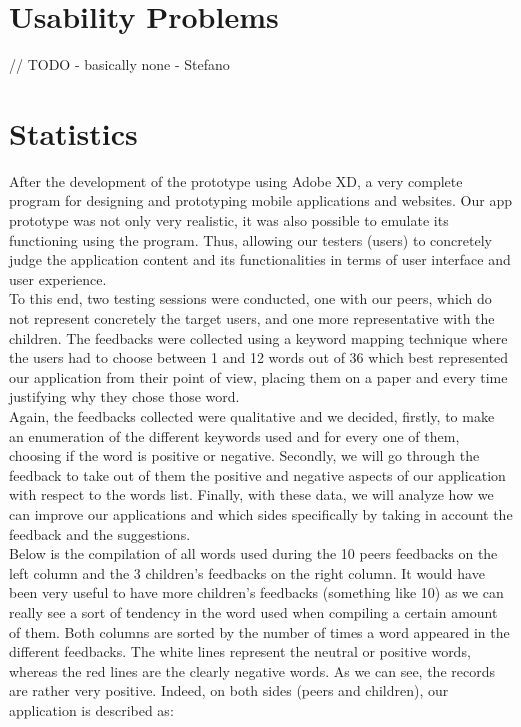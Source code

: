 \documentclass[12pt]{scrartcl}
\begin{document}
\section{Usability Problems}

	
	// TODO - basically none - Stefano
	
	
\section{Statistics}


	After the development of the prototype using Adobe XD, a very complete program for designing and prototyping mobile applications and websites. Our app prototype was not only very realistic, it was also possible to emulate its functioning using the program. Thus, allowing our testers (users) to concretely judge the application content and its functionalities in terms of user interface and user experience. \\

	To this end, two testing sessions were conducted, one with our peers, which do not represent concretely the target users, and one more representative with the children. The feedbacks were collected using a keyword mapping technique where the users had to choose between 1 and 12 words out of 36 which best represented our application from their point of view, placing them on a paper and every time justifying why they chose those word.\\

	Again, the feedbacks collected were qualitative and we decided, firstly, to make an enumeration of the different keywords used and for every one of them, choosing if the word is positive or negative. Secondly, we will go through the feedback to take out of them the positive and negative aspects of our application with respect to the words list. Finally, with these data, we will analyze how we can improve our applications and which sides specifically by taking in account the feedback and the suggestions.\\

	Below is the compilation of all words used during the 10 peers feedbacks on the left column and the 3 children’s feedbacks on the right column. It would have been very useful to have more children’s feedbacks (something like 10) as we can really see a sort of tendency in the word used when compiling a certain amount of them. Both columns are sorted by the number of times a word appeared in the different feedbacks. The white lines represent the neutral or positive words, whereas the red lines are the clearly negative words. As we can see, the records are rather very positive. Indeed, on both sides (peers and children), our application is described as:\\
	
\end{document}
